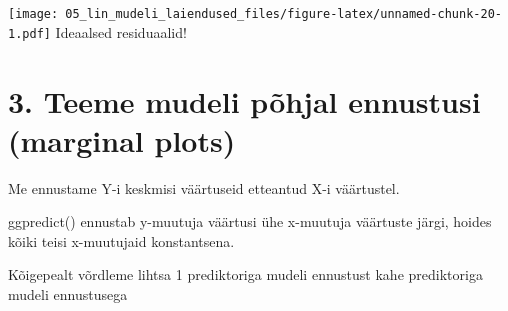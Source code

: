 \documentclass[]{book}
\begin{document}
\texttt{[image: 05\_lin\_mudeli\_laiendused\_files/figure-latex/unnamed-chunk-20-1.pdf]}
Ideaalsed residuaalid!

\section*{3. Teeme mudeli põhjal ennustusi (marginal
plots)}\label{teeme-mudeli-pohjal-ennustusi-marginal-plots}

Me ennustame Y-i keskmisi väärtuseid etteantud X-i väärtustel.

ggpredict() ennustab y-muutuja väärtusi ühe x-muutuja väärtuste järgi,
hoides kõiki teisi x-muutujaid konstantsena.

Kõigepealt võrdleme lihtsa 1 prediktoriga mudeli ennustust kahe
prediktoriga mudeli ennustusega
\end{document}
